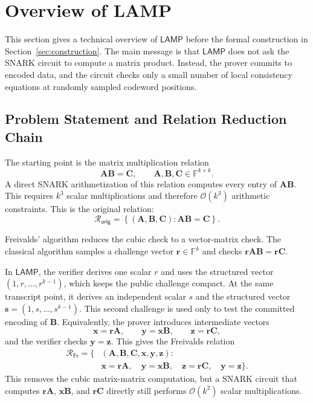 \documentclass[conference,compsoc]{IEEEtran}
\newcommand{\mat}{\mathbf}          %
\newcommand{\vect}{\mathbf}         %
\newcommand{\relation}{{\mathcal{R}}}
\newcommand{\protocol}{\textsf{LAMP}}   %
\theoremstyle{plain}
\theoremstyle{definition}
\theoremstyle{remark}
\providecommand{\DIFaddtex}[1]{{\protect\color{DIFADD} \sf #1}} %
\providecommand{\DIFaddbegin}{} %
\providecommand{\DIFaddend}{} %
\providecommand{\DIFadd}[1]{\texorpdfstring{\DIFaddtex{#1}}{#1}} %
\providecommand{\DIFaddincludegraphics}[2][]{{\color{blue}\fbox{\DIFOincludegraphics[#1]{#2}}}} %
\DeclareRobustCommand{\DIFaddbegin}{\DIFOaddbegin \let\includegraphics\DIFaddincludegraphics} %
\DeclareRobustCommand{\DIFaddend}{\DIFOaddend \let\includegraphics\DIFOincludegraphics} %
\begin{document}
\section{Overview of LAMP}
\label{sec:tech-overview}

This section gives a technical overview of \(\protocol\) before the formal
construction in Section~\ref{sec:construction}.  The main message is that
\(\protocol\) does not ask the SNARK circuit to compute a matrix product.
Instead, the prover commits to encoded data, and the circuit checks only a
small number of local consistency equations at randomly sampled codeword
positions.

\subsection{Problem Statement and Relation Reduction Chain}
\label{sec:overview-reduction-chain}

The starting point is the matrix multiplication relation
\[
  \mat{A}\mat{B}=\mat{C},
  \qquad
  \mat{A},\mat{B},\mat{C}\in\mathbb{F}^{k\times k}.
\]
A direct SNARK arithmetization of this relation computes every entry of
\(\mat{A}\mat{B}\).  This requires \(k^3\) scalar multiplications and therefore
\(\mathcal{O}(k^3)\) arithmetic constraints.  This is the original relation:
\[
\relation_{\mathsf{orig}}
=
\left\{
(\mat{A},\mat{B},\mat{C}) :
\mat{A}\mat{B}=\mat{C}
\right\}.
\]

Freivalds' algorithm reduces the cubic check to a vector-matrix check.  The
classical algorithm samples a challenge vector \(\vect{r}\in\mathbb{F}^k\) and checks
  $\vect{r}\mat{A}\mat{B}
  =
  \vect{r}\mat{C}.$

In \(\protocol\), the verifier derives one scalar \(r\) and uses the structured
vector \((1,r,\ldots,r^{k-1})\), which keeps the public challenge compact.
\DIFaddbegin \DIFadd{At the same transcript point, it derives an independent scalar \(s\) and the
structured vector \(\vect{s}=(1,s,\ldots,s^{k-1})\).  This second challenge is
used only to test the committed encoding of \(\mat{B}\).
}\DIFaddend Equivalently, the prover introduces intermediate vectors
\[
  \vect{x}=\vect{r}\mat{A},
  \qquad
  \vect{y}=\vect{x}\mat{B},
  \qquad
  \vect{z}=\vect{r}\mat{C},
\]
and the verifier checks \(\vect{y}=\vect{z}\).  This gives the Freivalds
relation
\[
\begin{aligned}
\relation_{\mathsf{Fr}}
=
\Big\{
&(\mat{A},\mat{B},\mat{C},\vect{x},\vect{y},\vect{z}) :
\\
&\vect{x}=\vect{r}\mat{A},\quad
  \vect{y}=\vect{x}\mat{B},\quad
  \vect{z}=\vect{r}\mat{C},\quad
  \vect{y}=\vect{z}
\Big\}.
\end{aligned}
\]
This removes the cubic matrix-matrix computation, but a SNARK circuit that
computes \(\vect{r}\mat{A}\), \(\vect{x}\mat{B}\), and \(\vect{r}\mat{C}\)
directly still performs \(\mathcal{O}(k^2)\) scalar multiplications.
\end{document}
